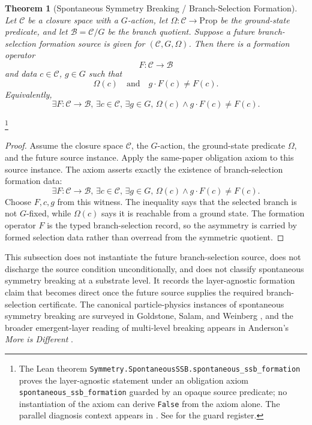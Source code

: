 \documentclass[11pt]{article}
\newtheorem{theorem}{Theorem}[section]
\theoremstyle{definition}
\begin{document}
\begin{theorem}[Spontaneous Symmetry Breaking / Branch-Selection Formation]\label{thm:F15b}
Let \(\mathcal C\) be a closure space with a \(G\)-action, let
\(\Omega:\mathcal C\to\mathrm{Prop}\) be the ground-state predicate,
and let \(\mathcal B=\mathcal C/G\) be the branch quotient.  Suppose
a future branch-selection formation source is given for
\((\mathcal C,G,\Omega)\).  Then there is a formation operator
\[
  F:\mathcal C\longrightarrow\mathcal B
\]
and data \(c\in\mathcal C\), \(g\in G\) such that
\[
  \Omega(c)
  \quad\text{and}\quad
  g\cdot F(c)\ne F(c).
\]
Equivalently,
\[
  \exists F:\mathcal C\to\mathcal B,\,
  \exists c\in\mathcal C,\,
  \exists g\in G,\,
  \Omega(c)\wedge g\cdot F(c)\ne F(c).
\]
\end{theorem}
\footnote{The Lean theorem
\texttt{Symmetry.SpontaneousSSB.spontaneous\_ssb\_formation}
proves the layer-agnostic statement under an obligation axiom
\texttt{spontaneous\_ssb\_formation} guarded by an opaque source
predicate; no instantiation of the axiom can derive \texttt{False}
from the axiom alone.  The parallel diagnosis context appears in
\citep{Tsiokos2026CSL}.  See  for the guard
register.}
\begin{proof}
Assume the closure space \(\mathcal C\), the \(G\)-action, the
ground-state predicate \(\Omega\), and the future source instance.
Apply the same-paper obligation axiom to this source instance.  The
axiom asserts exactly the existence of branch-selection formation
data:
\[
  \exists F:\mathcal C\to\mathcal B,\,
  \exists c\in\mathcal C,\,
  \exists g\in G,\,
  \Omega(c)\wedge g\cdot F(c)\ne F(c).
\]
Choose \(F,c,g\) from this witness.  The inequality says that the
selected branch is not \(G\)-fixed, while \(\Omega(c)\) says it is
reachable from a ground state.  The formation operator \(F\) is the
typed branch-selection record, so the asymmetry is carried by formed
selection data rather than overread from the symmetric quotient.
\end{proof}

This subsection does not instantiate the future branch-selection
source, does not discharge the source condition unconditionally, and
does not classify spontaneous symmetry breaking at a substrate level.
It records the layer-agnostic formation claim that becomes direct
once the future source supplies the required branch-selection
certificate.  The canonical particle-physics instances of spontaneous
symmetry breaking are surveyed in Goldstone, Salam, and Weinberg
\citep{Goldstone1962BrokenSymmetries}, and the broader emergent-layer
reading of multi-level breaking appears in
Anderson's \emph{More is Different} \citep{Anderson1972MoreIsDifferent}.
\end{document}
